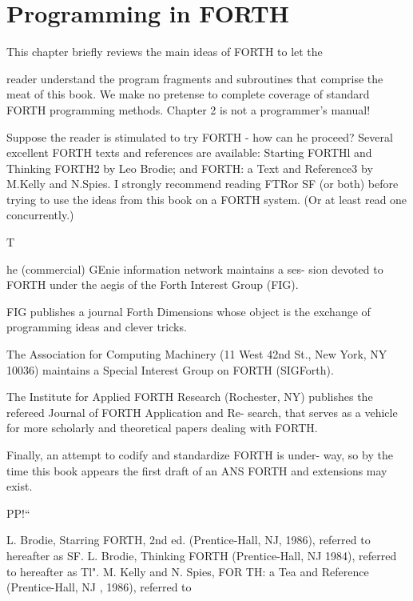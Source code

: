 ﻿\chapter{Programming in FORTH}



This chapter brieﬂy reviews the main ideas of FORTH to let the

reader understand the program fragments and subroutines
that comprise the meat of this book. We make no pretense to
complete coverage of standard FORTH programming methods.
Chapter 2 is not a programmer’s manual!



Suppose the reader is stimulated to try FORTH - how can he
proceed? Several excellent FORTH texts and references are
available: Starting FORTHl and Thinking FORTH2 by Leo
Brodie; and FORTH: a Text and Reference3 by M.Kelly and
N.Spies. I strongly recommend reading FTRor SF (or both)
before trying to use the ideas from this book on a FORTH system.
(Or at least read one concurrently.)

T

he (commercial) GEnie information network maintains a ses-
sion devoted to FORTH under the aegis of the Forth Interest
Group (FIG).



FIG publishes a journal Forth Dimensions whose object is the
exchange of programming ideas and clever tricks.


The Association for Computing Machinery (11 West 42nd St.,
New York, NY 10036) maintains a Special Interest Group on
FORTH (SIGForth).



The Institute for Applied FORTH Research (Rochester, NY)
publishes the refereed Journal of FORTH Application and Re-
search, that serves as a vehicle for more scholarly and theoretical
papers dealing with FORTH.



Finally, an attempt to codify and standardize FORTH is under-
way, so by the time this book appears the ﬁrst draft of an ANS
FORTH and extensions may exist.





PP!“

L. Brodie, Starring FORTH, 2nd ed. (Prentice-Hall, NJ, 1986), referred to hereafter as SF.
L. Brodie, Thinking FORTH (Prentice-Hall, NJ 1984), referred to hereafter as Tl".
M. Kelly and N. Spies, FOR TH: a Tea and Reference (Prentice-Hall, NJ , 1986), referred to

